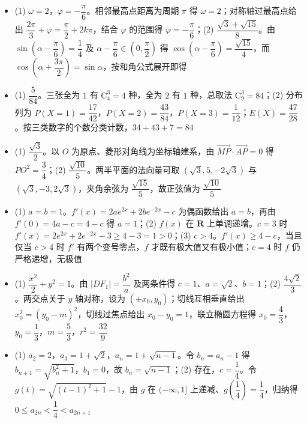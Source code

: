 \begin{itemize}[leftmargin=2.6em]
  \item[\textbf{17.}] (1) $\omega=2$，$\varphi=-\dfrac\pi6$。相邻最高点距离为周期 $\pi$ 得 $\omega=2$；对称轴过最高点给出 $\dfrac{2\pi}3+\varphi=\dfrac\pi2+2k\pi$，结合 $\varphi$ 的范围得 $\varphi=-\dfrac\pi6$；(2) $\dfrac{\sqrt3+\sqrt{15}}8$。由 $\sin\left(\alpha-\dfrac\pi6\right)=\dfrac14$ 及 $\alpha-\dfrac\pi6\in\left(0,\dfrac\pi2\right)$ 得 $\cos\left(\alpha-\dfrac\pi6\right)=\dfrac{\sqrt{15}}4$，而 $\cos\left(\alpha+\dfrac{3\pi}2\right)=\sin\alpha$，按和角公式展开即得
  \item[\textbf{18.}] (1) $\dfrac5{84}$。三张全为 $1$ 有 $\mathrm C_4^3=4$ 种，全为 $2$ 有 $1$ 种，总取法 $\mathrm C_9^3=84$；(2) 分布列为 $P(X=1)=\dfrac{17}{42}$，$P(X=2)=\dfrac{43}{84}$，$P(X=3)=\dfrac1{12}$；$E(X)=\dfrac{47}{28}$。按三类数字的个数分类计数，$34+43+7=84$
  \item[\textbf{19.}] (1) $\dfrac{\sqrt3}2$。以 $O$ 为原点、菱形对角线为坐标轴建系，由 $\overrightarrow{MP}\cdot\overrightarrow{AP}=0$ 得 $PO^2=\dfrac34$；(2) $\dfrac{\sqrt{10}}5$。两半平面的法向量可取 $(\sqrt3,5,-2\sqrt3)$ 与 $(\sqrt3,-3,2\sqrt3)$，夹角余弦为 $\dfrac{\sqrt{15}}5$，故正弦值为 $\dfrac{\sqrt{10}}5$
  \item[\textbf{20.}] (1) $a=b=1$。$f'(x)=2ae^{2x}+2be^{-2x}-c$ 为偶函数给出 $a=b$，再由 $f'(0)=4a-c=4-c$ 得 $a=1$；(2) $f(x)$ 在 $\mathbf R$ 上单调递增。$c=3$ 时 $f'(x)=2e^{2x}+2e^{-2x}-3\geqslant4-3=1>0$；(3) $c>4$。$f'(x)\geqslant4-c$，当且仅当 $c>4$ 时 $f'$ 有两个变号零点，$f$ 才既有极大值又有极小值；$c=4$ 时 $f$ 仍严格递增，无极值
  \item[\textbf{21.}] (1) $\dfrac{x^2}2+y^2=1$。由 $|DF_1|=\dfrac{b^2}a$ 及两条件得 $c=1$、$a=\sqrt2$、$b=1$；(2) $\dfrac{4\sqrt2}3$。两交点关于 $y$ 轴对称，设为 $(\pm x_0,y_0)$；切线互相垂直给出 $x_0^2=(y_0-m)^2$，切线过焦点给出 $x_0-y_0=1$，联立椭圆方程得 $x_0=\dfrac43$，$y_0=\dfrac13$，$m=\dfrac53$，$r^2=\dfrac{32}9$
  \item[\textbf{22.}] (1) $a_2=2$，$a_3=1+\sqrt2$，$a_n=1+\sqrt{n-1}$。令 $b_n=a_n-1$ 得 $b_{n+1}=\sqrt{b_n^2+1}$，$b_1=0$，故 $b_n=\sqrt{n-1}$；(2) 存在，$c=\dfrac14$。令 $g(t)=\sqrt{(t-1)^2+1}-1$，由 $g$ 在 $(-\infty,1]$ 上递减、$g\left(\dfrac14\right)=\dfrac14$，归纳得 $0\leqslant a_{2n}<\dfrac14<a_{2n+1}$
\end{itemize}
